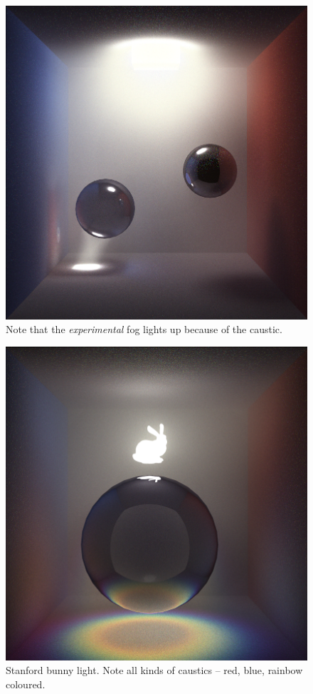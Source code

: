 \documentclass[12pt]{article}
\begin{document}
\begin{figure} 
\centering
  \includegraphics[width = 6 in]{fig9.png}
  \caption{ Note that the {\textit{experimental}} fog lights up because of the caustic.
}
\end{figure}


\begin{figure} 
\centering
  \includegraphics[width = 6 in]{fig10.png}
  \caption{ Stanford bunny light.
Note all kinds of caustics -- red, blue, rainbow coloured.
}
\end{figure}
\end{document}
